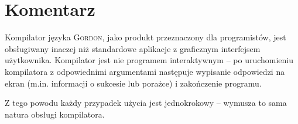 \documentclass{documentation}
\begin{document}
\section{Komentarz}
\noindent Kompilator języka \textsc{Gordon}, jako produkt przeznaczony dla programistów, jest
obsługiwany inaczej niż standardowe aplikacje z graficznym interfejsem użytkownika. Kompilator
jest nie programem interaktywnym -- po uruchomieniu kompilatora z odpowiednimi argumentami
następuje wypisanie odpowiedzi na ekran (m.in. informacji o sukcesie lub porażce) i zakończenie
programu.

Z tego powodu każdy przypadek użycia jest jednokrokowy -- wymusza to sama natura obsługi
kompilatora.
\end{document}
